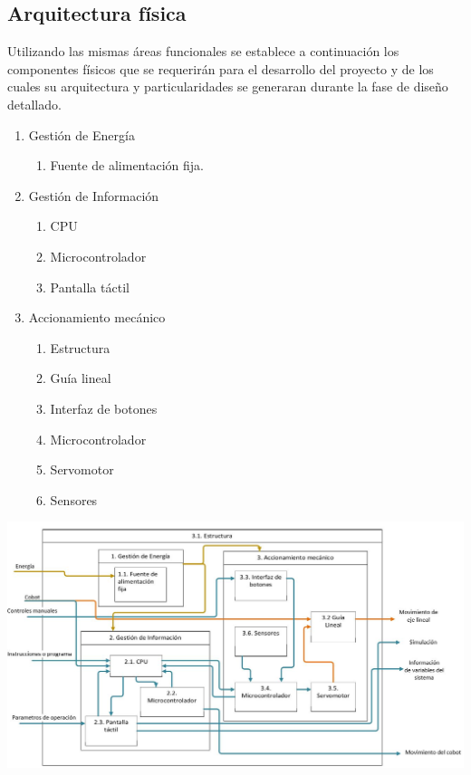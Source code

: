 \subsection{Arquitectura física}
Utilizando las mismas áreas funcionales se establece a continuación los componentes físicos que se requerirán para el desarrollo del proyecto y de los cuales su arquitectura y particularidades se generaran durante la fase de diseño detallado.
\begin{enumerate}
    \item Gestión de Energía
    \begin{enumerate}[label*=\arabic*.]
        \item Fuente de alimentación fija.
    \end{enumerate}
    \item Gestión de Información
        \begin{enumerate}[label*=\arabic*.]
        \item CPU
        \item Microcontrolador
        \item Pantalla táctil
        \end{enumerate}
    \item Accionamiento mecánico
    \begin{enumerate}[label*=\arabic*.]
        \item Estructura
        \item Guía lineal
        \item Interfaz de botones
        \item Microcontrolador
        \item Servomotor
        \item Sensores
     \end{enumerate}
\end{enumerate}
\begin{center}
    \includegraphics[scale=0.45]{imagenes/Arquitectura del TT.JPG}
    \label{fig:idef_af}
\end{center}
